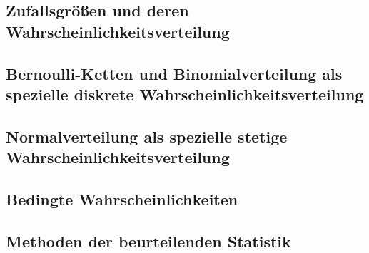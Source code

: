 \documentclass{article}
\begin{document}
        \subsection{Zufallsgrößen und deren Wahrscheinlichkeitsverteilung}
        \subsection{Bernoulli-Ketten und Binomialverteilung als spezielle diskrete Wahrscheinlichkeitsverteilung}
        \subsection{Normalverteilung als spezielle stetige Wahrscheinlichkeitsverteilung}
        \subsection{Bedingte Wahrscheinlichkeiten}
        \subsection{Methoden der beurteilenden Statistik}
\end{document}
